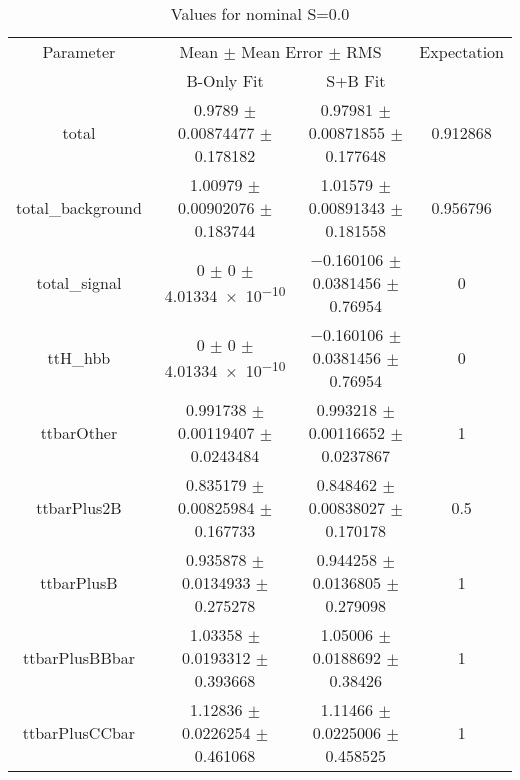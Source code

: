 \begin{table}
\centering
\caption{Values for nominal S=0.0}
\begin{tabular}{cccc}
\toprule
Parameter & \multicolumn{2}{c}{Mean $\pm$ Mean Error $\pm$ RMS} & Expectation\\
 & B-Only Fit & S+B Fit & \\
\midrule
total & \num{0.9789} $\pm$ \num{0.00874477} $\pm$ \num{0.178182} & \num{0.97981} $\pm$ \num{0.00871855} $\pm$ \num{0.177648} & \num{0.912868}\\
total\_background & \num{1.00979} $\pm$ \num{0.00902076} $\pm$ \num{0.183744} & \num{1.01579} $\pm$ \num{0.00891343} $\pm$ \num{0.181558} & \num{0.956796}\\
total\_signal & \num{0} $\pm$ \num{0} $\pm$ \num{4.01334e-10} & \num{-0.160106} $\pm$ \num{0.0381456} $\pm$ \num{0.76954} & \num{0}\\
ttH\_hbb & \num{0} $\pm$ \num{0} $\pm$ \num{4.01334e-10} & \num{-0.160106} $\pm$ \num{0.0381456} $\pm$ \num{0.76954} & \num{0}\\
ttbarOther & \num{0.991738} $\pm$ \num{0.00119407} $\pm$ \num{0.0243484} & \num{0.993218} $\pm$ \num{0.00116652} $\pm$ \num{0.0237867} & \num{1}\\
ttbarPlus2B & \num{0.835179} $\pm$ \num{0.00825984} $\pm$ \num{0.167733} & \num{0.848462} $\pm$ \num{0.00838027} $\pm$ \num{0.170178} & \num{0.5}\\
ttbarPlusB & \num{0.935878} $\pm$ \num{0.0134933} $\pm$ \num{0.275278} & \num{0.944258} $\pm$ \num{0.0136805} $\pm$ \num{0.279098} & \num{1}\\
ttbarPlusBBbar & \num{1.03358} $\pm$ \num{0.0193312} $\pm$ \num{0.393668} & \num{1.05006} $\pm$ \num{0.0188692} $\pm$ \num{0.38426} & \num{1}\\
ttbarPlusCCbar & \num{1.12836} $\pm$ \num{0.0226254} $\pm$ \num{0.461068} & \num{1.11466} $\pm$ \num{0.0225006} $\pm$ \num{0.458525} & \num{1}\\
\bottomrule
\end{tabular}
\end{table}